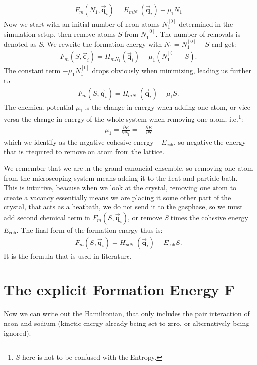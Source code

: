 \begin{align}
	F_m(N_1,\vec{\mathbf{q}}_{i}) = H_{mN_1}(\vec{\mathbf{q}}_{i}) - \mu_1 N_1
\end{align}
Now we start with an initial number of neon atoms $N_{1}^{[0]}$ determined in the simulation setup, then remove atoms $S$ from $N_{1}^{[0]}$. The number of removals is denoted as $S$. We rewrite the formation energy with $N_1 = N_{1}^{[0]}-S$ and get:
\begin{align}
	F_m(S,\vec{\mathbf{q}}_{i}) = H_{mN_1}(\vec{\mathbf{q}}_{i}) - \mu_1 (N_{1}^{[0]}-S).
\end{align}
The constant term $-\mu_1 N_1^{[0]}$ drops obviously when minimizing, leading us further to
\begin{align}
	F_m(S,\vec{\mathbf{q}}_{i}) = H_{mN_1}(\vec{\mathbf{q}}_{i}) + \mu_1 S.
\end{align}
The chemical potential $\mu_1$ is the change in energy when adding one atom, or vice versa the change in energy of the whole system when removing one atom, i.e.\footnote{$S$ here is not to be confused with the Entropy.}:
\begin{align}
	\mu_1 =\frac{\partial E}{\partial N_1} = - \frac{\partial E}{\partial S} 
\end{align} which we identify as the negative cohesive energy $-E_{\text{coh}}$, so negative the energy that is rtequired to remove on atom from the lattice.

We remember that we are in the grand canoncial ensemble, so removing one atom from the microscoping system means adding it to the heat and particle bath. This is intuitive, beacuse when we look at the crystal, removing one atom to create a vacancy essentially means we are placing it some other part of the crystal, that acts as a heatbath, we do not send it to the gasphase, so we must add second chemical term in $F_m(S,\vec{\mathbf{q}}_i)$, or remove $S$ times the cohesive energy $E_{\text{coh}}$. The final form of the formation energy thus is:
\begin{align}
	F_m(S,\vec{\mathbf{q}}_{i}) = H_{mN_1}(\vec{\mathbf{q}}_{i}) - E_{\text{coh}} S.	
\end{align}It is the formula that is used in literature. %
\section{The explicit Formation Energy F}
Now we can write out the Hamiltonian, that only includes the pair interaction of neon and sodium (kinetic energy already being set to zero, or alternatively being ignored).
